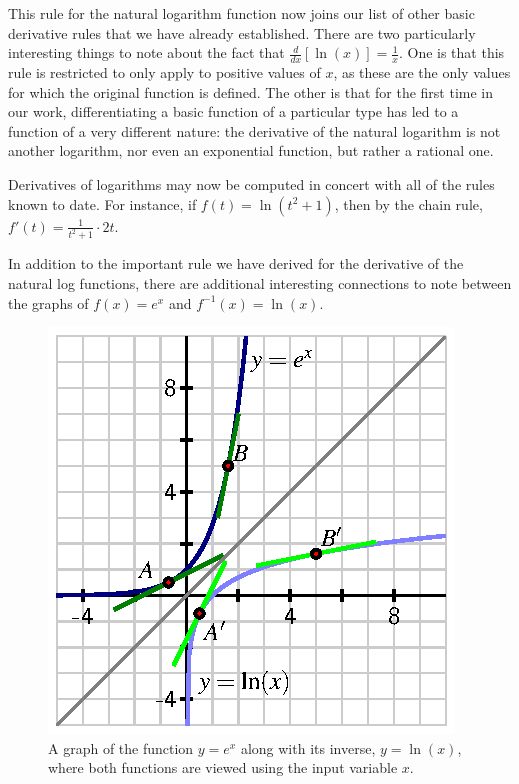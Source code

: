 \vspace*{5pt}
\nin {}
\vspace*{1pt}

This rule for the natural logarithm function now joins our list of other basic derivative rules that we have already established.  There are two particularly interesting things to note about the fact that $\frac{d}{dx}[\ln(x)] = \frac{1}{x}$. One is that this rule is restricted to only apply to positive values of $x$, as these are the only values for which the original function is defined.  The other is that for the first time in our work, differentiating a basic function of a particular type has led to a function of a very different nature:  the derivative of the natural logarithm is not another logarithm, nor even an exponential function, but rather a rational one.

Derivatives of logarithms may now be computed in concert with all of the rules known to date.  For instance, if $f(t) = \ln(t^2 + 1)$, then by the chain rule, $f'(t) = \frac{1}{t^2 + 1} \cdot 2t$.



In addition to the important rule we have derived for the derivative of the natural log functions, there are additional interesting connections to note between the graphs of $f(x) = e^x$ and $f^{-1}(x) = \ln(x)$.

\begin{figure}[h]
\begin{center}
\includegraphics{figures/2_6_LogExp.eps}
\caption{A graph of the function $y = e^x$ along with its inverse, $y = \ln(x)$, where both functions are viewed using the input variable $x$.} \label{F:2.6.LogExp}
\end{center}
\end{figure}

